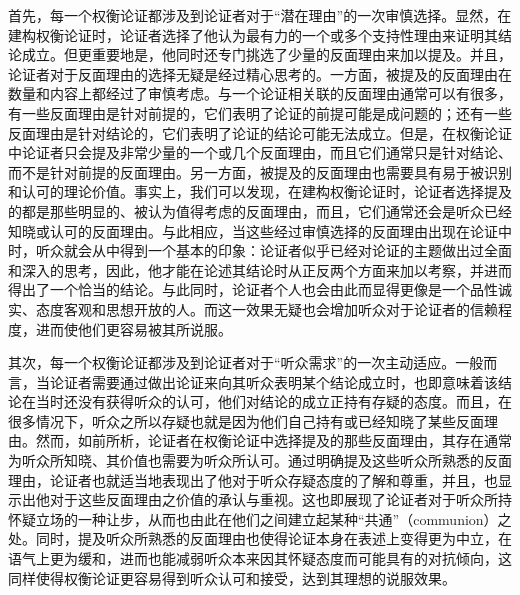 \documentclass[b5paper,10.5pt,onecolumn,twoside,UTF8]{article}
\begin{document}
首先，每一个权衡论证都涉及到论证者对于“潜在理由”的一次审慎选择。显然，在建构权衡论证时，论证者选择了他认为最有力的一个或多个支持性理由来证明其结论成立。但更重要地是，他同时还专门挑选了少量的反面理由来加以提及。并且，论证者对于反面理由的选择无疑是经过精心思考的。一方面，被提及的反面理由在数量和内容上都经过了审慎考虑。与一个论证相关联的反面理由通常可以有很多，有一些反面理由是针对前提的，它们表明了论证的前提可能是成问题的；还有一些反面理由是针对结论的，它们表明了论证的结论可能无法成立。但是，在权衡论证中论证者只会提及非常少量的一个或几个反面理由，而且它们通常只是针对结论、而不是针对前提的反面理由。另一方面，被提及的反面理由也需要具有易于被识别和认可的理论价值。事实上，我们可以发现，在建构权衡论证时，论证者选择提及的都是那些明显的、被认为值得考虑的反面理由，而且，它们通常还会是听众已经知晓或认可的反面理由。与此相应，当这些经过审慎选择的反面理由出现在论证中时，听众就会从中得到一个基本的印象：论证者似乎已经对论证的主题做出过全面和深入的思考，因此，他才能在论述其结论时从正反两个方面来加以考察，并进而得出了一个恰当的结论。与此同时，论证者个人也会由此而显得更像是一个品性诚实、态度客观和思想开放的人。而这一效果无疑也会增加听众对于论证者的信赖程度，进而使他们更容易被其所说服。

其次，每一个权衡论证都涉及到论证者对于“听众需求”的一次主动适应。一般而言，当论证者需要通过做出论证来向其听众表明某个结论成立时，也即意味着该结论在当时还没有获得听众的认可，他们对结论的成立正持有存疑的态度。而且，在很多情况下，听众之所以存疑也就是因为他们自己持有或已经知晓了某些反面理由。然而，如前所析，论证者在权衡论证中选择提及的那些反面理由，其存在通常为听众所知晓、其价值也需要为听众所认可。通过明确提及这些听众所熟悉的反面理由，论证者也就适当地表现出了他对于听众存疑态度的了解和尊重，并且，也显示出他对于这些反面理由之价值的承认与重视。这也即展现了论证者对于听众所持怀疑立场的一种让步，从而也由此在他们之间建立起某种“共通”（communion）之处。同时，提及听众所熟悉的反面理由也使得论证本身在表述上变得更为中立，在语气上更为缓和，进而也能减弱听众本来因其怀疑态度而可能具有的对抗倾向，这同样使得权衡论证更容易得到听众认可和接受，达到其理想的说服效果。
\end{document}
